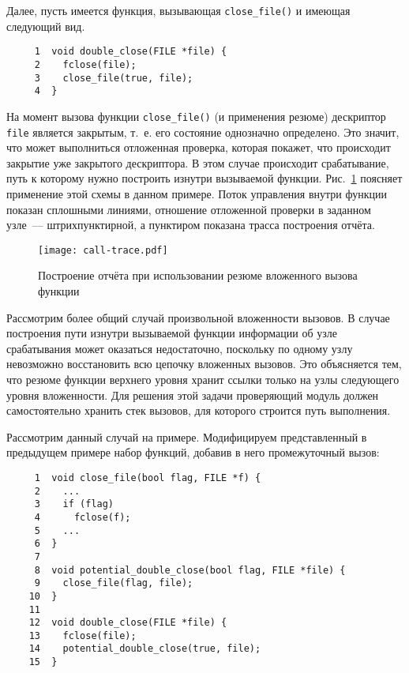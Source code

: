 Далее, пусть имеется функция, вызывающая \texttt{close\_file()} и имеющая следующий вид.

\begin{verbatim}
     1  void double_close(FILE *file) {
     2    fclose(file);
     3    close_file(true, file);
     4  }
\end{verbatim}

На момент вызова функции \texttt{close\_file()} (и применения резюме) дескриптор \texttt{file} является закрытым, т.~е. его состояние однозначно определено. Это значит, что может выполниться отложенная проверка, которая покажет, что происходит закрытие уже закрытого дескриптора. В этом случае происходит срабатывание, путь к которому нужно построить изнутри вызываемой функции. Рис.~\ref{pic:call-trace} поясняет применение этой схемы в данном примере. Поток управления внутри функции показан сплошными линиями, отношение отложенной проверки в заданном узле~--- штрихпунктирной, а пунктиром показана трасса построения отчёта.

\begin{figure}
   \centering
   \texttt{[image: call-trace.pdf]}
   \caption{Построение отчёта при использовании резюме вложенного вызова функции}\label{pic:call-trace}
\end{figure}


Рассмотрим более общий случай произвольной вложенности вызовов. В случае построения пути изнутри вызываемой функции информации об узле срабатывания может оказаться недостаточно, поскольку по одному узлу невозможно восстановить всю цепочку вложенных вызовов. Это объясняется тем, что резюме функции верхнего уровня хранит ссылки только на узлы следующего уровня вложенности. Для решения этой задачи проверяющий модуль должен самостоятельно хранить стек вызовов, для которого строится путь выполнения.

Рассмотрим данный случай на примере. Модифицируем представленный в предыдущем примере набор функций, добавив в него промежуточный вызов:

\begin{verbatim}
     1  void close_file(bool flag, FILE *f) {
     2    ...
     3    if (flag)
     4      fclose(f);
     5    ...
     6  }
     7
     8  void potential_double_close(bool flag, FILE *file) {
     9    close_file(flag, file);
    10  }
    11
    12  void double_close(FILE *file) {
    13    fclose(file);
    14    potential_double_close(true, file);
    15  }
\end{verbatim}

